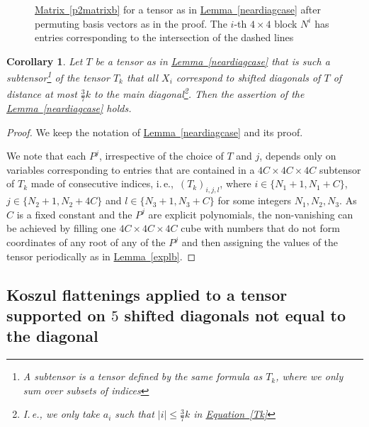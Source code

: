 \documentclass[11pt]{article}
\newcommand{\expref}[2]{\texorpdfstring{\hyperref[#2]{#1~\ref{#2}}}{#1~\ref{#2}}}
\newcommand{\expeqref}[2]{\texorpdfstring{\hyperref[#2]{#1~\eqref{#2}}}{#1~\eqref{#2}}}
\newtheorem{corollary}[theorem]{Corollary}
\newcommand{\ie}{i.\,e.}
\newcommand{\Ie}{I.\,e.}
\begin{document}
\begin{figure}[ht]
\begin{center}
\caption{\expeqref{Matrix}{p2matrixb} for a tensor as in \expref{Lemma}{neardiagcase}  after permuting basis vectors as in the proof. The $i$-th $4\times 4$ block $N^i$ has entries corresponding to the intersection of the dashed lines}\label{fig:4x4}
\end{center}
\end{figure}
\begin{corollary}\label{cor:subTkclosediag}
Let $T$ be a tensor as in \expref{Lemma}{neardiagcase}
that is such a subtensor\footnote{%
%
A \emph{subtensor} is %
a tensor defined by the same formula as $T_k$, where we only sum over subsets of indices} of the tensor $T_k$ that all  $X_i$ correspond to 
%
shifted 
diagonals of $T$ of distance at most $\frac{3}{7}k$ to the main
%
diagonal\footnote{\Ie, we only %
take $a_i$ such that $|i|\leq \frac{3}{7}k$ in \expeqref{Equation}{Tk}}. Then the assertion of the \expref{Lemma}{neardiagcase} holds.
\end{corollary}
\begin{proof}
We keep the notation of \expref{Lemma}{neardiagcase} and its proof.

We note that each $P^j$, irrespective of the choice of $T$ and $j$, depends only on variables corresponding to entries that are contained in a $4C\times 4C\times 4C$ subtensor of $T_k$  made of consecutive indices, \ie,~$(T_{k})_{i,j,l}$, where $i\in \{N_1+1,N_1+C\}$, $j\in \{N_2+1,N_2+4C\}$ and $l\in \{N_3+1,N_3+C\}$ for some integers $N_1,N_2,N_3$. As $C$ is a fixed constant and
the  %
$P^j$ are explicit polynomials, the non-vanishing can be achieved by filling
one $4C\times 4C\times 4C$ cube with numbers 
%
that do not form coordinates of any root of 
%
%
%
 any of the $P^j$   %
%
%
and then assigning the values of the tensor periodically as in \expref{Lemma}{explb}.
\end{proof}

%

\subsection{Koszul flattenings applied to  a tensor supported on $5$ 
%
shifted
diagonals not equal to the diagonal}
\end{document}
